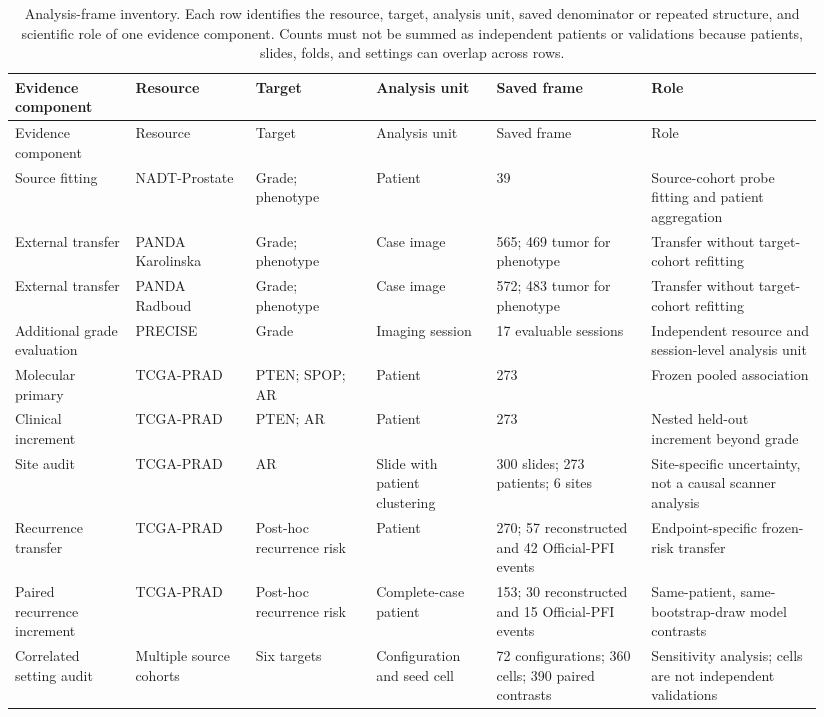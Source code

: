 \begingroup
\fontsize{9.5pt}{11pt}\selectfont
\setlength{\tabcolsep}{3pt}
\begin{longtable}{@{}p{0.14\linewidth}p{0.14\linewidth}p{0.14\linewidth}p{0.14\linewidth}p{0.18\linewidth}p{0.20\linewidth}@{}}
\caption{Analysis-frame inventory. Each row identifies the resource, target, analysis unit, saved denominator or repeated structure, and scientific role of one evidence component. Counts must not be summed as independent patients or validations because patients, slides, folds, and settings can overlap across rows.}
\label{tab:supp-analysis-frame-inventory}\\
\toprule
Evidence component & Resource & Target & Analysis unit & Saved frame & Role \\
\midrule
\endfirsthead
\toprule
Evidence component & Resource & Target & Analysis unit & Saved frame & Role \\
\midrule
\endhead
Source fitting & NADT-Prostate & Grade; phenotype & Patient & 39 & Source-cohort probe fitting and patient aggregation \\
External transfer & PANDA Karolinska & Grade; phenotype & Case image & 565; 469 tumor for phenotype & Transfer without target-cohort refitting \\
External transfer & PANDA Radboud & Grade; phenotype & Case image & 572; 483 tumor for phenotype & Transfer without target-cohort refitting \\
Additional grade evaluation & PRECISE & Grade & Imaging session & 17 evaluable sessions & Independent resource and session-level analysis unit \\
Molecular primary & TCGA-PRAD & PTEN; SPOP; AR & Patient & 273 & Frozen pooled association \\
Clinical increment & TCGA-PRAD & PTEN; AR & Patient & 273 & Nested held-out increment beyond grade \\
Site audit & TCGA-PRAD & AR & Slide with patient clustering & 300 slides; 273 patients; 6 sites & Site-specific uncertainty, not a causal scanner analysis \\
Recurrence transfer & TCGA-PRAD & Post-hoc recurrence risk & Patient & 270; 57 reconstructed and 42 Official-PFI events & Endpoint-specific frozen-risk transfer \\
Paired recurrence increment & TCGA-PRAD & Post-hoc recurrence risk & Complete-case patient & 153; 30 reconstructed and 15 Official-PFI events & Same-patient, same-bootstrap-draw model contrasts \\
Correlated setting audit & Multiple source cohorts & Six targets & Configuration and seed cell & 72 configurations; 360 cells; 390 paired contrasts & Sensitivity analysis; cells are not independent validations \\
\bottomrule
\end{longtable}
\endgroup

